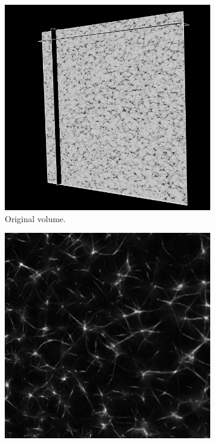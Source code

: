 \begin{figure}[H]
  \centering
  \begin{subfigure}{0.5\textwidth}
    \centering
    \includegraphics[width=0.9\linewidth]{Figures/chapter-image/pipeline_screenshots/actin_volume.png}
    \caption{Original volume.}
    \label{fig:actin_original}
  \end{subfigure}%
  \begin{subfigure}{0.5\textwidth}
    \centering
    \includegraphics[width=0.9\linewidth]{Figures/chapter-image/pipeline_screenshots/actin_denoised_wavelet_anisotropic.png}

\end{subfigure}
\end{figure}
